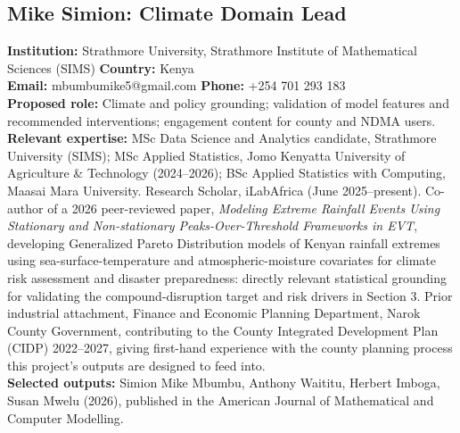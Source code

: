 \documentclass[12pt,a4paper]{article}
\begin{document}
\subsection*{Mike Simion: Climate Domain Lead}
\textbf{Institution:} Strathmore University, Strathmore Institute of Mathematical Sciences (SIMS) \quad \textbf{Country:} Kenya \\
\textbf{Email:} mbumbumike5@gmail.com \quad \textbf{Phone:} +254 701 293 183 \\
\textbf{Proposed role:} Climate and policy grounding; validation of model features and recommended interventions; engagement content for county and NDMA users. \\
\textbf{Relevant expertise:} MSc Data Science and Analytics candidate, Strathmore University (SIMS); MSc Applied Statistics, Jomo Kenyatta University of Agriculture \& Technology (2024--2026); BSc Applied Statistics with Computing, Maasai Mara University. Research Scholar, iLabAfrica (June 2025--present). Co-author of a 2026 peer-reviewed paper, \emph{Modeling Extreme Rainfall Events Using Stationary and Non-stationary Peaks-Over-Threshold Frameworks in EVT}, developing Generalized Pareto Distribution models of Kenyan rainfall extremes using sea-surface-temperature and atmospheric-moisture covariates for climate risk assessment and disaster preparedness: directly relevant statistical grounding for validating the compound-disruption target and risk drivers in Section 3. Prior industrial attachment, Finance and Economic Planning Department, Narok County Government, contributing to the County Integrated Development Plan (CIDP) 2022--2027, giving first-hand experience with the county planning process this project's outputs are designed to feed into. \\
\textbf{Selected outputs:} Simion Mike Mbumbu, Anthony Waititu, Herbert Imboga, Susan Mwelu (2026), published in the American Journal of Mathematical and Computer Modelling.
\end{document}
